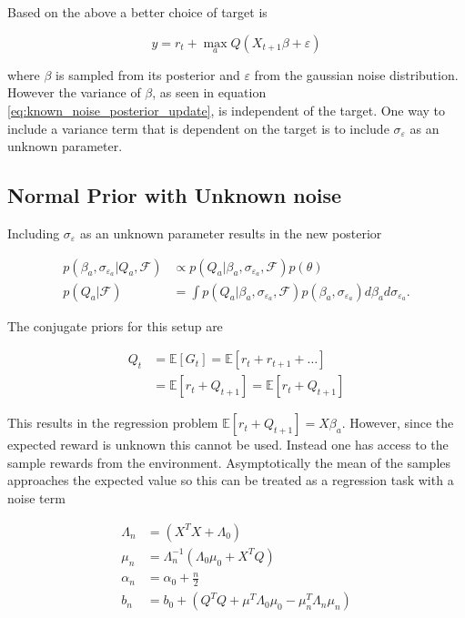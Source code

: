 Based on the above a better choice of target is

$$
y = r_t + \max_aQ(X_{t+1}\beta + \varepsilon)
$$

where $\beta$ is sampled from its posterior and $\varepsilon$ from the gaussian noise distribution. However the variance of $\beta$, as seen in equation \ref{eq:known_noise_posterior_update}, is independent of the target. One way to include a variance term that is dependent on the target is to include $\sigma_{\varepsilon}$ as an unknown parameter.

\subsection{Normal Prior with Unknown noise}

Including $\sigma_{\varepsilon}$ as an unknown parameter results in the new posterior 

\begin{align*}
    p(\beta_a, \sigma_{\varepsilon_a}|Q_a, \mathcal{F}) &\propto p(Q_a| \beta_a, \sigma_{\varepsilon_a}, \mathcal{F})p(\theta) \\
    p(Q_a|\mathcal{F}) &= \int p(Q_a|\beta_a, \sigma_{\varepsilon_a}, \mathcal{F}) p(\beta_a, \sigma_{\varepsilon_a})d\beta_a d\sigma_{\varepsilon_a}.
\end{align*}

The conjugate priors for this setup are

\begin{align*}
    Q_t &= \mathbb{E}[G_t] = \mathbb{E}[r_t + r_{t+1} + \dots] \\
    &= \mathbb{E}[r_t + Q_{t+1}] = \mathbb{E}[r_t + Q_{t+1}]
\end{align*}

This results in the regression problem $\mathbb{E}[r_t + Q_{t+1}] = X\beta_a$. However, since the expected reward is unknown this cannot be used. Instead one has access to the sample rewards from the environment. Asymptotically the mean of the samples approaches the expected value so this can be treated as a regression task with a noise term

\begin{align*}
    \label{eq:unknown_noise_posterior_update}
	\Lambda_n & = (X^TX + \Lambda_0)                                         \\
	\mu_n     & = \Lambda_n^{-1}(\Lambda_0\mu_0 + X^TQ)                      \\
	\alpha_n  & = \alpha_0 + \frac{n}{2}                                     \\
	b_n       & = b_0 + (Q^TQ + \mu^T\Lambda_0\mu_0 - \mu_n^T\Lambda_n\mu_n) 
\end{align*}

